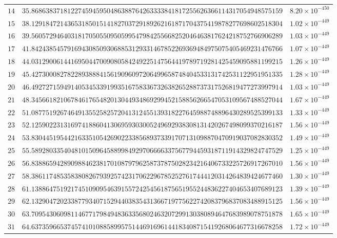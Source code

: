 \documentclass[12pt,reqno]{amsart}
\theoremstyle{remark}
\begin{document}
\begin{longtable}{clc}
$14$ & $35.8686383718122745945950486388764263333841817255626366114317054948575159$ & $8.20\times 10^{-450}$ \\
$15$ & $38.1291847214365318501514182703729189262161871704375419878277698602518304$ & $1.02\times 10^{-449}$ \\
$16$ & $39.5605729464031817050550950599547984255668252046463817624218752766906289$ & $1.03\times 10^{-449}$ \\
$17$ & $41.8424385457916943085093068853129331467852269369484975075405469231476766$ & $1.07\times 10^{-449}$ \\
$18$ & $44.0312900614416950447009080584249225147564419789719281425459095881199215$ & $1.26\times 10^{-449}$ \\
$19$ & $45.4273000827822893888415619096097206499658748404533131742531122951951335$ & $1.28\times 10^{-449}$ \\
$20$ & $46.4927271594914053453391993516758336732638265288737317526819477273997914$ & $1.03\times 10^{-449}$ \\
$21$ & $48.3456618210678461765482013044934869299452158856266547053109567488527044$ & $1.67\times 10^{-449}$ \\
$22$ & $51.0877519267464913552582572041312455139318227645988748896430289525399133$ & $1.33\times 10^{-449}$ \\
$23$ & $52.1259022313169741886041306959303005249692938308131420267498099370216187$ & $1.56\times 10^{-449}$ \\
$24$ & $53.8304451954421633510542690223385689373391707131098870470919037082830352$ & $1.49\times 10^{-449}$ \\
$25$ & $55.5892803354048101509645889984929706666337567794459318711914329824747529$ & $1.25\times 10^{-449}$ \\
$26$ & $56.8388659428909884623817010879796258737875028234216406733225726917267010$ & $1.56\times 10^{-449}$ \\
$27$ & $58.3861174853583808267939257423170622967852527617444120314264839424677460$ & $1.30\times 10^{-449}$ \\
$28$ & $61.1388647519217451090954639155724254561875651955244836227404653407689123$ & $1.39\times 10^{-449}$ \\
$29$ & $62.1329047202338779340715294403835431366719775622742083796837083488915125$ & $1.56\times 10^{-449}$ \\
$30$ & $63.7095430609811467717984948363356802463207299130380894647683989078751878$ & $1.65\times 10^{-449}$ \\
$31$ & $64.6373596653745741010885899575144691696144183408715419268064677316678258$ & $1.72\times 10^{-449}$ \\

\end{longtable}
\end{document}
